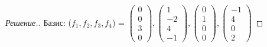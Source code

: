 \documentclass[a4paper]{article}
\theoremstyle{remark}
\begin{document}
\begin{proof}[Решение.]
            Базис: ($f_1, f_2, f_3, f_4$) = $
            \begin{pmatrix}
                0\\
                0\\
                3\\
                0
            \end{pmatrix}, 
            \begin{pmatrix}
                1\\
                -2\\
                4\\
                -1
            \end{pmatrix}, 
            \begin{pmatrix}
                0\\
                1\\
                0\\
                0
            \end{pmatrix}, 
            \begin{pmatrix}
                -1\\
                4\\
                0\\
                2
            \end{pmatrix}
            $
        \end{proof}
      
\end{document}
